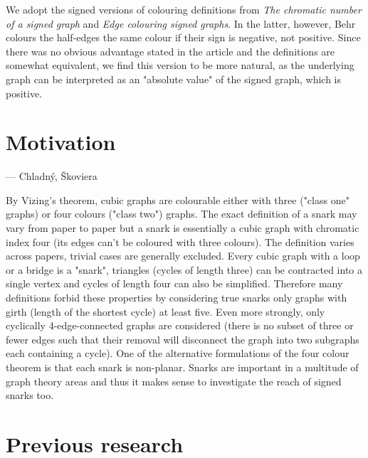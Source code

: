 We adopt the signed versions of colouring definitions from \textit{The chromatic number of a signed graph}\cite{chromatic-number} and \textit{Edge colouring signed graphs}\cite{behr-edge-colouring}. In the latter, however, Behr colours the half-edges the same colour if their sign is negative, not positive. Since there was no obvious advantage stated in the article and the definitions are somewhat equivalent, we find this version to be more natural, as the underlying graph can be interpreted as an "absolute value" of the signed graph, which is positive.

\section{Motivation}

 --- Chladný, Škoviera \cite{skoviera-citat}

By Vizing's theorem, cubic graphs are colourable either with three ("class one" graphs) or four colours ("class two") graphs. The exact definition of a snark may vary from paper to paper but a snark is essentially a cubic graph with chromatic index four (its edges can't be coloured with three colours). The definition varies across papers, trivial cases are generally excluded. Every cubic graph with a loop or a bridge is a "snark", triangles (cycles of length three) can be contracted into a single vertex and cycles of length four can also be simplified. Therefore many definitions forbid these properties by considering true snarks only graphs with girth (length of the shortest cycle) at least five. Even more strongly, only cyclically 4-edge-connected graphs are considered (there is no subset of three or fewer edges such that their removal will disconnect the graph into two subgraphs each containing a cycle). One of the alternative formulations of the four colour theorem is that each snark is non-planar. Snarks are important in a multitude of graph theory areas and thus it makes sense to investigate the reach of signed snarks too.

\section{Previous research}

